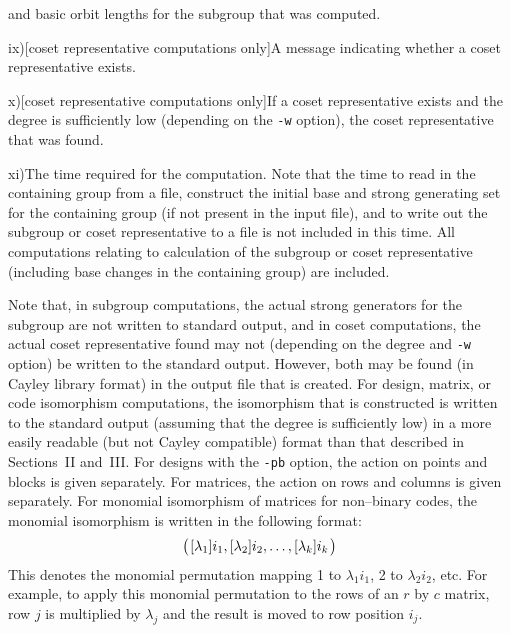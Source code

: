 {and basic orbit lengths for the subgroup that was computed.
\smallskip
\item{ix)}[coset representative computations only]\enskip A message indicating whether a coset
representative exists.
\smallskip
\item{x)}[coset representative computations only]\enskip If a coset representative exists and the degree is sufficiently
low (depending on the {\tt -w} option), the coset representative that was
found.  
\smallskip
\item{xi)}The time required for the computation.  Note that the time to
read in the containing group from a file, construct the initial base and
strong generating set for the containing group (if not present in the input
file), and to write out the subgroup or coset representative to a file is
not included in this time.  All computations relating to calculation of
the subgroup or coset representative (including base changes in the containing
group) are included.
\medbreak}
%
Note that, in subgroup computations, the actual strong generators for the
subgroup are not written to standard output, and in coset computations,
the actual coset representative found may not (depending on the degree and
{\tt -w} option) be written to the standard output.  However, both may be
found (in Cayley library format) in the output file that is created.
\medbreak
For design, matrix, or code isomorphism computations, the isomorphism that
is constructed is written to the standard output (assuming that the degree
is sufficiently low) in a more easily readable
(but not Cayley compatible) format than that described in Sections~II
and~III.  For designs with the {\tt -pb} option,
the action on points and blocks is given separately.  For matrices, the
action on rows and columns is given separately.  For monomial isomorphism of
matrices for non--binary codes, the monomial 
isomorphism is written in the following format:
$$\bigl(\kern1pt[\lambda_1]i_1,[\lambda_2]i_2,\ldots,[\lambda_k]i_k\kern1pt\bigr)$$
This denotes the monomial permutation mapping 1 to $\lambda_1i_1$,
2 to $\lambda_2i_2$, etc.  For example, to apply this monomial permutation
to the rows of an $r$ by $c$ matrix, row $j$ is multiplied by $\lambda_j$
and the result is moved to row position $i_j$.

%
\medbreak
%
%
%
